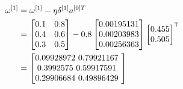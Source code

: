 \documentclass{article}
\begin{document}
\[
    \begin{aligned}
        \omega^{[1]} & =\omega^{[1]}-\eta\delta^{[1]}a^{[0]T} \\
                     & =\begin{bmatrix}
                            0.1 & 0.8 \\
                            0.4 & 0.6 \\
                            0.3 & 0.5 \\
                        \end{bmatrix}
        - 0.8 \begin{bmatrix}
                  0.00195131 \\
                  0.00203983 \\
                  0.00256363 \\
              \end{bmatrix}
        \begin{bmatrix}
            0.455 \\
            0.505 \\
        \end{bmatrix}^{\mathsf{T}}                      \\
                     & = \begin{bmatrix}
                             0.09928972 $ 0.79921167 $ \\
                             0.3992575  $ 0.59917591 $ \\
                             0.29906684 $ 0.49896429 $ \\
                         \end{bmatrix}
    \end{aligned}
\]
\end{document}

